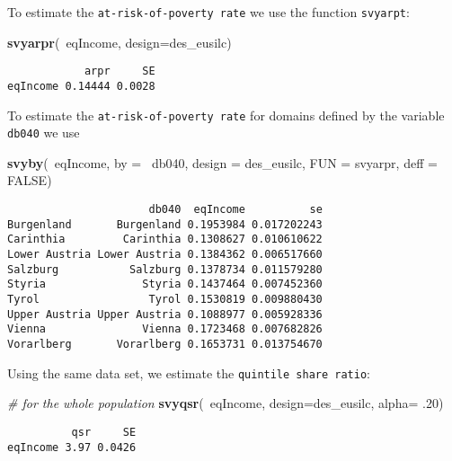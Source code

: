 \documentclass[]{book}
\newenvironment{Shaded}{\begin{snugshade}}{\end{snugshade}}
\newcommand{\KeywordTok}[1]{\textcolor[rgb]{0.13,0.29,0.53}{\textbf{{#1}}}}
\newcommand{\DataTypeTok}[1]{\textcolor[rgb]{0.13,0.29,0.53}{{#1}}}
\newcommand{\DecValTok}[1]{\textcolor[rgb]{0.00,0.00,0.81}{{#1}}}
\newcommand{\CommentTok}[1]{\textcolor[rgb]{0.56,0.35,0.01}{\textit{{#1}}}}
\newcommand{\OtherTok}[1]{\textcolor[rgb]{0.56,0.35,0.01}{{#1}}}
\newcommand{\NormalTok}[1]{{#1}}
\begin{document}
To estimate the \texttt{at-risk-of-poverty\ rate} we use the function
\texttt{svyarpt}:

\begin{Shaded}
\begin{Highlighting}[]
\KeywordTok{svyarpr}\NormalTok{(~eqIncome, }\DataTypeTok{design=}\NormalTok{des_eusilc)}
\end{Highlighting}
\end{Shaded}

\begin{verbatim}
            arpr     SE
eqIncome 0.14444 0.0028
\end{verbatim}

To estimate the \texttt{at-risk-of-poverty\ rate} for domains defined by
the variable \texttt{db040} we use

\begin{Shaded}
\begin{Highlighting}[]
\KeywordTok{svyby}\NormalTok{(~eqIncome, }\DataTypeTok{by =} \NormalTok{~db040, }\DataTypeTok{design =} \NormalTok{des_eusilc, }\DataTypeTok{FUN =} \NormalTok{svyarpr, }\DataTypeTok{deff =} \OtherTok{FALSE}\NormalTok{)}
\end{Highlighting}
\end{Shaded}

\begin{verbatim}
                      db040  eqIncome          se
Burgenland       Burgenland 0.1953984 0.017202243
Carinthia         Carinthia 0.1308627 0.010610622
Lower Austria Lower Austria 0.1384362 0.006517660
Salzburg           Salzburg 0.1378734 0.011579280
Styria               Styria 0.1437464 0.007452360
Tyrol                 Tyrol 0.1530819 0.009880430
Upper Austria Upper Austria 0.1088977 0.005928336
Vienna               Vienna 0.1723468 0.007682826
Vorarlberg       Vorarlberg 0.1653731 0.013754670
\end{verbatim}

Using the same data set, we estimate the
\texttt{quintile\ share\ ratio}:

\begin{Shaded}
\begin{Highlighting}[]
\CommentTok{# for the whole population}
\KeywordTok{svyqsr}\NormalTok{(~eqIncome, }\DataTypeTok{design=}\NormalTok{des_eusilc, }\DataTypeTok{alpha=} \NormalTok{.}\DecValTok{20}\NormalTok{)}
\end{Highlighting}
\end{Shaded}

\begin{verbatim}
          qsr     SE
eqIncome 3.97 0.0426
\end{verbatim}
\end{document}
